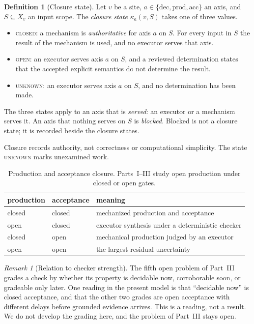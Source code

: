 \documentclass[11pt]{article}
\theoremstyle{definition}
\newtheorem{definition}{Definition}
\theoremstyle{remark}
\newtheorem{remark}{Remark}
\newcommand{\cstate}[1]{\textup{\textsc{#1}}}
\begin{document}
\begin{definition}[Closure state]\label{def:closure}
Let $v$ be a site, $a\in\{\mathrm{dec},\mathrm{prod},\mathrm{acc}\}$ an axis, and $S\subseteq X_v$ an
input scope. The \emph{closure state} $\kappa_a(v,S)$ takes one of three values.
\begin{itemize}[leftmargin=1.4em,itemsep=1pt]
\item \cstate{closed}: a mechanism is \emph{authoritative} for axis $a$ on $S$. For every input in $S$
the result of the mechanism is used, and no executor serves that axis.
\item \cstate{open}: an executor serves axis $a$ on $S$, and a reviewed determination states that the
accepted explicit semantics do not determine the result.
\item \cstate{unknown}: an executor serves axis $a$ on $S$, and no determination has been made.
\end{itemize}
The three states apply to an axis that is \emph{served}: an executor or a mechanism serves it. An
axis that nothing serves on $S$ is \emph{blocked}. Blocked is not a closure state; it is recorded
beside the closure states.
\end{definition}

Closure records authority, not correctness or computational simplicity.
The state \cstate{unknown} marks unexamined work.

\begin{table}[ht]
\centering
\small
\begin{tabular}{lll}
\toprule
production & acceptance & meaning \\
\midrule
closed & closed & mechanized production and acceptance \\
open & closed & executor synthesis under a deterministic checker \\
closed & open & mechanical production judged by an executor \\
open & open & the largest residual uncertainty \\
\bottomrule
\end{tabular}
\caption{Production and acceptance closure. Parts~I--III study open production under closed
or open gates.}\label{tab:matrix}
\end{table}

\begin{remark}[Relation to checker strength]\label{rem:strength}
The fifth open problem of Part~III grades a check by whether its property is decidable now,
corroborable soon, or gradeable only later. One reading in the present model is that ``decidable
now'' is closed acceptance, and that the other two grades are open acceptance with different delays
before grounded evidence arrives. This is a reading, not a result. We do not develop the grading
here, and the problem of Part~III stays open.
\end{remark}
\end{document}
